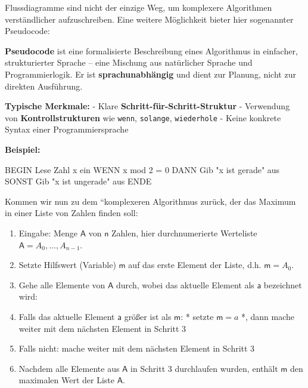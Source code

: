 \documentclass[
  letterpaper,
  DIV=11,
  numbers=noendperiod]{scrreprt}
\newenvironment{Shaded}{\begin{snugshade}}{\end{snugshade}}
\newcommand{\NormalTok}[1]{\textcolor[rgb]{0.00,0.23,0.31}{#1}}
\providecommand{\tightlist}{%
  \setlength{\itemsep}{0pt}\setlength{\parskip}{0pt}}\usepackage{longtable,booktabs,array}
\begin{document}
Flussdiagramme sind nicht der einzige Weg, um komplexere Algorithmen
verständlicher aufzuschreiben. Eine weitere Möglichkeit bieter hier
sogenannter Pseudocode:

\begin{tcolorbox}[enhanced jigsaw, left=2mm, leftrule=.75mm, bottomrule=.15mm, title=\textcolor{quarto-callout-note-color}{\faInfo}\hspace{0.5em}{Pseudocode -- Vom Gedanken zum Programm}, colback=white, arc=.35mm, breakable, titlerule=0mm, bottomtitle=1mm, colbacktitle=quarto-callout-note-color!10!white, toprule=.15mm, opacityback=0, coltitle=black, rightrule=.15mm, opacitybacktitle=0.6, toptitle=1mm, colframe=quarto-callout-note-color-frame]

\textbf{Pseudocode} ist eine formalisierte Beschreibung eines
Algorithmus in einfacher, strukturierter Sprache -- eine Mischung aus
natürlicher Sprache und Programmierlogik. Er ist
\textbf{sprachunabhängig} und dient zur Planung, nicht zur direkten
Ausführung.

\textbf{Typische Merkmale:} - Klare
\textbf{Schritt-für-Schritt-Struktur} - Verwendung von
\textbf{Kontrollstrukturen} wie \texttt{wenn}, \texttt{solange},
\texttt{wiederhole} - Keine konkrete Syntax einer Programmiersprache

\textbf{Beispiel:}

\begin{Shaded}
\begin{Highlighting}[]
\NormalTok{BEGIN}
\NormalTok{  Lese Zahl x ein}
\NormalTok{  WENN x mod 2 = 0 DANN}
\NormalTok{    Gib "x ist gerade" aus}
\NormalTok{  SONST}
\NormalTok{    Gib "x ist ungerade" aus}
\NormalTok{ENDE}
\end{Highlighting}
\end{Shaded}

\end{tcolorbox}

Kommen wir nun zu dem ``komplexeren Algorithmus zurück, der das Maximum
in einer Liste von Zahlen finden soll:

\begin{enumerate}
\def\labelenumi{\arabic{enumi}.}
\tightlist
\item
  Eingabe: Menge \(\mathsf A\) von \(\mathsf n\) Zahlen, hier
  durchnumerierte Werteliste \(\mathsf A=A_0, \dots, A_{n-1}\).
\item
  Setzte Hilfswert (Variable) \(\mathsf m\) auf das erste Element der
  Liste, d.h. \(\mathsf m = A_0\).
\item
  Gehe alle Elemente von \(\mathsf A\) durch, wobei das aktuelle Element
  als \(\mathsf a\) bezeichnet wird:
\item
  Falls das aktuelle Element \(\mathsf a\) größer ist als \(\mathsf m\):
  * setzte \(\mathsf m = a\) *, dann mache weiter mit dem nächsten
  Element in Schritt 3
\item
  Falls nicht: mache weiter mit dem nächsten Element in Schritt 3
\item
  Nachdem alle Elemente aus \(\mathsf A\) in Schritt 3 durchlaufen
  wurden, enthält \(\mathsf m\) den maximalen Wert der Liste
  \(\mathsf A\).
\end{enumerate}
\end{document}
